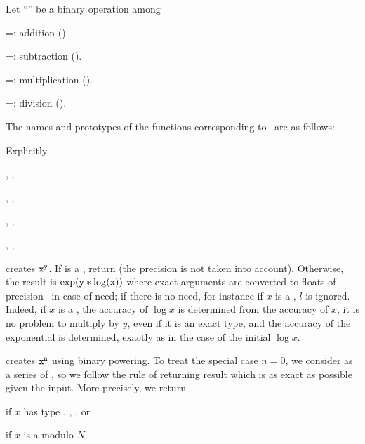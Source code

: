Let ``\op'' be a binary operation among

\op=: addition ().

\op=: subtraction ().

\op=: multiplication ().

\op=: division ().

\noindent The names and prototypes of the functions corresponding
to \op\ are as follows:




\noindent Explicitly

, ,

, ,

, ,

, ,


 creates ${\tt x}^{{\tt y}}$. If
 is a , return  (the precision  is not
taken into account). Otherwise, the result is $\exp({\tt y}*\log({\tt x}))$
where exact arguments are converted to floats of precision~ in case of
need; if there is no need, for instance if $x$ is a , $l$ is
ignored. Indeed, if $x$ is a , the accuracy of $\log x$ is
determined from the accuracy of $x$, it is no problem to multiply by $y$,
even if it is an exact type, and the accuracy of the exponential is
determined, exactly as in the case of the initial $\log x$.

 creates ${\tt x}^{{\tt n}}$ using
binary powering. To treat the special case $n = 0$, we consider
 as a series of , so we follow the rule of returning
result which is as exact as possible given the input. More precisely,
we return
\item {} if $x$ has type , ,  , or

\item {} if $x$ is a  modulo $N$.

